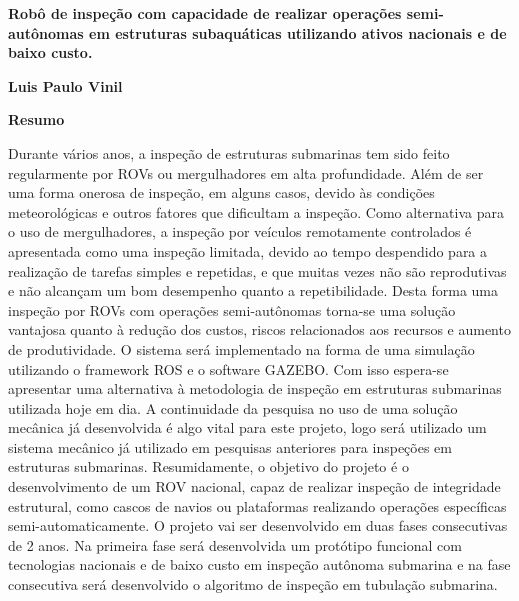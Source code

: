 \newpage
\thispagestyle{empty}
\begin{center}
  \textbf{\Large Robô de inspeção com capacidade de realizar operações semi-autônomas em estruturas subaquáticas utilizando ativos nacionais e de baixo custo.
  }

  \vspace*{1cm}
  \textbf{\large Luis Paulo Vinil}

  \vspace*{2cm}

  \textbf{\large Resumo}
\end{center}
Durante vários anos, a inspeção de estruturas submarinas tem sido feito regularmente por ROVs ou mergulhadores em alta profundidade. Além de ser uma forma onerosa de inspeção, em alguns casos, devido às condições meteorológicas e outros fatores que dificultam a inspeção. Como alternativa para o uso de mergulhadores, a inspeção por veículos remotamente controlados é apresentada como uma inspeção limitada, devido ao tempo despendido para a realização de tarefas simples e repetidas, e que muitas vezes não são reprodutivas e não alcançam um bom desempenho quanto a repetibilidade.
Desta forma uma inspeção por ROVs com operações semi-autônomas torna-se uma solução vantajosa quanto à redução dos custos, riscos relacionados aos recursos e aumento de produtividade. 
O sistema será implementado na forma de uma simulação utilizando o framework ROS e o software GAZEBO. Com isso espera-se apresentar uma alternativa à metodologia de inspeção em estruturas submarinas utilizada hoje em dia. A continuidade da pesquisa no uso de uma solução mecânica já desenvolvida é algo vital para este projeto, logo será utilizado um sistema mecânico já utilizado em pesquisas anteriores para inspeções em estruturas submarinas.
Resumidamente, o objetivo do projeto é o desenvolvimento de um ROV nacional, capaz de realizar inspeção de integridade estrutural, como cascos de navios ou plataformas realizando operações específicas semi-automaticamente. O projeto vai ser desenvolvido em duas fases consecutivas de 2 anos. Na primeira fase será desenvolvida um protótipo funcional com tecnologias nacionais e de baixo custo em inspeção autônoma submarina e na fase consecutiva será desenvolvido o algoritmo de inspeção em tubulação submarina.

